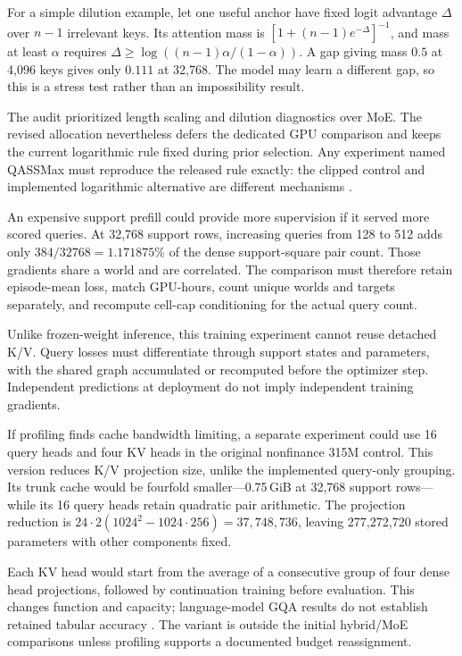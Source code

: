 \documentclass[11pt]{article}
\begin{document}
For a simple dilution example, let one useful anchor have fixed logit advantage $\Delta$ over $n-1$ irrelevant keys. Its attention mass is $[1+(n-1)e^{-\Delta}]^{-1}$, and mass at least $\alpha$ requires $\Delta\geq\log((n-1)\alpha/(1-\alpha))$. A gap giving mass $0.5$ at 4,096 keys gives only $0.111$ at 32,768. The model may learn a different gap, so this is a stress test rather than an impossibility result.

The audit prioritized length scaling and dilution diagnostics over MoE. The revised allocation nevertheless defers the dedicated GPU comparison and keeps the current logarithmic rule fixed during prior selection. Any experiment named QASSMax must reproduce the released rule exactly: the clipped control and implemented logarithmic alternative are different mechanisms \cite{tabicl2}.

An expensive support prefill could provide more supervision if it served more scored queries. At 32,768 support rows, increasing queries from 128 to 512 adds only $384/32768=1.171875\%$ of the dense support-square pair count. Those gradients share a world and are correlated. The comparison must therefore retain episode-mean loss, match GPU-hours, count unique worlds and targets separately, and recompute cell-cap conditioning for the actual query count.

Unlike frozen-weight inference, this training experiment cannot reuse detached K/V. Query losses must differentiate through support states and parameters, with the shared graph accumulated or recomputed before the optimizer step. Independent predictions at deployment do not imply independent training gradients.

If profiling finds cache bandwidth limiting, a separate experiment could use 16 query heads and four KV heads in the original nonfinance 315M control. This version reduces K/V projection size, unlike the implemented query-only grouping. Its trunk cache would be fourfold smaller---0.75\,GiB at 32,768 support rows---while its 16 query heads retain quadratic pair arithmetic. The projection reduction is $24\cdot2(1024^2-1024\cdot256)=37{,}748{,}736$, leaving 277,272,720 stored parameters with other components fixed.

Each KV head would start from the average of a consecutive group of four dense head projections, followed by continuation training before evaluation. This changes function and capacity; language-model GQA results do not establish retained tabular accuracy \cite{gqa}. The variant is outside the initial hybrid/MoE comparisons unless profiling supports a documented budget reassignment.
\end{document}
